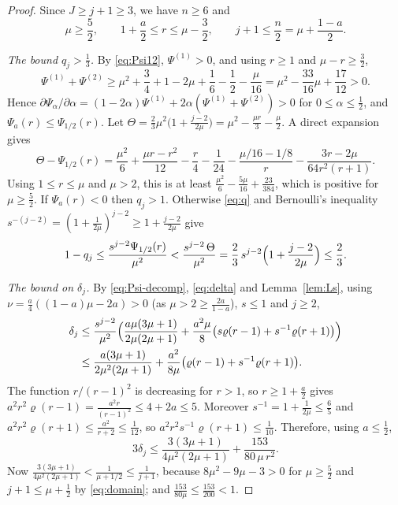 \documentclass[11pt]{amsart}
\theoremstyle{definition}
\theoremstyle{remark}
\numberwithin{equation}{section}
\begin{document}
\begin{proof}
Since $J\ge j+1\ge3$, we have $n\ge6$ and
\begin{equation}\label{eq:domain}
\mu\ge\frac52,\qquad1+\frac a2\le r\le\mu-\frac32,\qquad j+1\le\frac n2=\mu+\frac{1-a}2.
\end{equation}

\emph{The bound $q_j>\frac13$.} By \eqref{eq:Psi12}, $\Psi^{(1)}>0$, and using $r\ge1$ and $\mu-r\ge\frac32$,
\[
\Psi^{(1)}+\Psi^{(2)}\ge\mu^2+\frac34+1-2\mu+\frac16-\frac12-\frac\mu{16}=\mu^2-\frac{33}{16}\mu+\frac{17}{12}>0.
\]
Hence $\partial\Psi_\alpha/\partial\alpha=(1-2\alpha)\Psi^{(1)}+2\alpha(\Psi^{(1)}+\Psi^{(2)})>0$ for $0\le\alpha\le\frac12$, and $\Psi_a(r)\le\Psi_{1/2}(r)$. Let $\Theta=\frac23\mu^2\bigl(1+\frac{j-2}{2\mu}\bigr)=\mu^2-\frac{\mu r}3-\frac\mu2$. A direct expansion gives
\[
\Theta-\Psi_{1/2}(r)=\frac{\mu^2}6+\frac{\mu r-r^2}{12}-\frac r4-\frac1{24}-\frac{\mu/16-1/8}{r}-\frac{3r-2\mu}{64r^2(r+1)}.
\]
Using $1\le r\le\mu$ and $\mu>2$, this is at least $\frac{\mu^2}6-\frac{5\mu}{16}+\frac{23}{384}$, which is positive for $\mu\ge\frac52$. If $\Psi_a(r)<0$ then $q_j>1$. Otherwise \eqref{eq:q} and Bernoulli's inequality $s^{-(j-2)}=(1+\frac1{2\mu})^{j-2}\ge1+\frac{j-2}{2\mu}$ give
\[
1-q_j\le\frac{s^{j-2}\Psi_{1/2}(r)}{\mu^2}<\frac{s^{j-2}\,\Theta}{\mu^2}=\frac23\,s^{j-2}\Bigl(1+\frac{j-2}{2\mu}\Bigr)\le\frac23.
\]

\emph{The bound on $\delta_j$.} By \eqref{eq:Psi-decomp}, \eqref{eq:delta} and Lemma~\ref{lem:Ls}, using $\nu=\frac a4((1-a)\mu-2a)>0$ (as $\mu>2\ge\frac{2a}{1-a}$), $s\le1$ and $j\ge2$,
\begin{align*}
\delta_j&\le\frac{s^{j-2}}{\mu^2}\Bigl(\frac{a\mu(3\mu+1)}{2\mu(2\mu+1)}+\frac{a^2\mu}8\bigl(s\varrho(r-1)+s^{-1}\varrho(r+1)\bigr)\Bigr)\\
&\le\frac{a(3\mu+1)}{2\mu^2(2\mu+1)}+\frac{a^2}{8\mu}\bigl(\varrho(r-1)+s^{-1}\varrho(r+1)\bigr).
\end{align*}
The function $r/(r-1)^2$ is decreasing for $r>1$, so $r\ge1+\frac a2$ gives $a^2r^2\varrho(r-1)=\frac{a^2r}{(r-1)^2}\le4+2a\le5$. Moreover $s^{-1}=1+\frac1{2\mu}\le\frac65$ and $a^2r^2\varrho(r+1)\le\frac{a^2}{r+2}\le\frac1{12}$, so $a^2r^2s^{-1}\varrho(r+1)\le\frac1{10}$. Therefore, using $a\le\frac12$,
\[
3\delta_j\le\frac{3(3\mu+1)}{4\mu^2(2\mu+1)}+\frac{153}{80\,\mu\,r^2}.
\]
Now $\frac{3(3\mu+1)}{4\mu^2(2\mu+1)}<\frac1{\mu+1/2}\le\frac1{j+1}$, because $8\mu^2-9\mu-3>0$ for $\mu\ge\frac52$ and $j+1\le\mu+\frac12$ by \eqref{eq:domain}; and $\frac{153}{80\mu}\le\frac{153}{200}<1$.
\end{proof}
\end{document}
